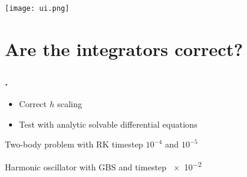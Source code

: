 \documentclass{beamer}
\begin{document}
%
%
%    


\begin{frame}
\texttt{[image: ui.png]}
\end{frame}

\section{Are the integrators correct?}
\begin{frame}
\frametitle{\thesection. \insertsection}
\begin{itemize}
	\item Correct $h$ scaling
	\item Test with analytic solvable differential equations
\end{itemize}	
\end{frame}

\begin{frame}
\centering 
Two-body problem with RK timestep $10^{-4}$ and $10^{-5}$
\vspace{-0.25cm}
\begin{figure}
		
\end{figure}
\end{frame}

\begin{frame}
\centering
Harmonic oscillator with GBS and timestep \num{e-2}
\vspace{-1cm}
\begin{figure}
			
\end{figure}
\end{frame}
\end{document}
